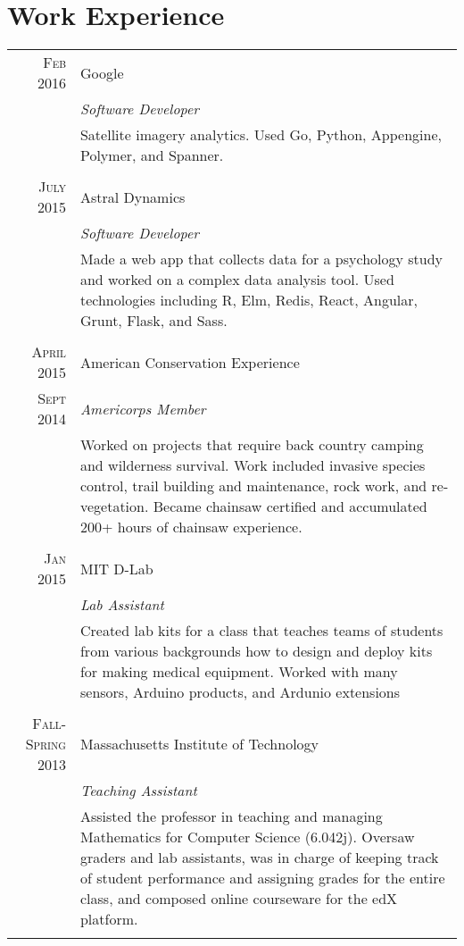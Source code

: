 \documentclass[a4paper,10pt]{article}
\begin{document}
\section{Work Experience}
\begin{tabular}{r|p{11cm}}
 \textsc{Feb 2016} & Google \\&\emph{Software Developer} \\&\footnotesize{Satellite imagery analytics. Used Go, Python, Appengine, Polymer, and Spanner.}\\\multicolumn{2}{c}{}\\
 \textsc{July 2015} & Astral Dynamics \\&\emph{Software Developer} \\&\footnotesize{Made a web app that collects data for a psychology study and worked on a complex data analysis tool. Used technologies including R, Elm, Redis, React, Angular, Grunt, Flask, and Sass.}\\\multicolumn{2}{c}{}\\
  \textsc{April 2015} & American Conservation Experience \\\textsc{Sept 2014}&\emph{Americorps Member}\\&\footnotesize{Worked on projects that require back country camping and wilderness survival. Work included invasive species control, trail building and maintenance, rock work, and re-vegetation. Became chainsaw certified and accumulated 200+ hours of chainsaw experience.}\\\multicolumn{2}{c}{} \\
  \textsc{Jan 2015} & MIT D-Lab \\&\emph{Lab Assistant}\\&\footnotesize{Created lab kits for a class that teaches teams of students from various backgrounds how to design and deploy kits for making medical equipment. Worked with many sensors, Arduino products, and Ardunio extensions}\\\multicolumn{2}{c}{} \\
 \textsc{Fall-Spring 2013} & Massachusetts Institute of Technology \\&\emph{Teaching Assistant}\\&\footnotesize{Assisted the professor in teaching and managing Mathematics for Computer Science (6.042j). Oversaw graders and lab assistants, was in charge of keeping track of student performance and assigning grades for the entire class, and composed online courseware for the edX platform.}\\\multicolumn{2}{c}{} \\

\end{tabular}
\end{document}
